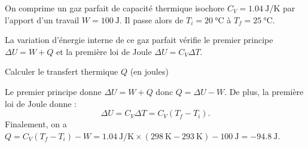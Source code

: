	On comprime un gaz parfait de capacité thermique isochore $C_V=\SI{1,04}{\joule\per\kelvin}$ par l'apport d'un travail $W=\SI{100}{\joule}$. 
	Il passe alors de $T_i=\SI{20}{\celsius}$ à $T_f=\SI{25}{\celsius}$. 
	
	La variation d'énergie interne de ce gaz parfait vérifie le premier principe $\Delta U = W+Q$ et la première loi de Joule $\Delta U = C_V \Delta T$.


\begin{enonce}
Calculer le transfert thermique $Q$ (en joules)
\end{enonce}


\begin{corrige}
Le premier principe donne $\Delta U=W+Q$ donc $Q=\Delta U-W$. 
De plus, la première loi de Joule donne : 
\[
\Delta U=C_V\Delta T=C_V\left(T_f-T_i\right).
\]
Finalement, on a $Q=C_V\left(T_f-T_i\right)-W=\SI{1,04}{\joule\per\kelvin}\times\left(\SI{298}{\kelvin}-\SI{293}{\kelvin}\right)-\SI{100}{\joule}=\SI{-94,8}{\joule}$.
\end{corrige}


\finEntrainement








\hauteurLargeurCadreReponse		{8mm}{1cm}
\initialisationEntrainement


\debutEntrainement

